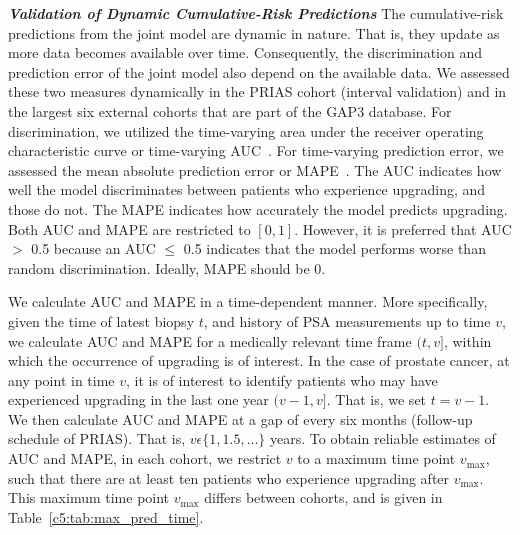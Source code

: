 \begin{subappendices}
\textbf{\textit{Validation of Dynamic Cumulative-Risk Predictions}}
The cumulative-risk predictions from the joint model are dynamic in nature. That is, they update as more data becomes available over time. Consequently, the discrimination and prediction error of the joint model also depend on the available data. We assessed these two measures dynamically in the PRIAS cohort (interval validation) and in the largest six external cohorts that are part of the GAP3 database. For discrimination, we utilized the time-varying area under the receiver operating characteristic curve or time-varying AUC~\citep{rizopoulos2017dynamic}. For time-varying prediction error, we assessed the mean absolute prediction error or MAPE~\citep{rizopoulos2017dynamic}. The AUC indicates how well the model discriminates between patients who experience upgrading, and those do not. The MAPE indicates how accurately the model predicts upgrading. Both AUC and MAPE are restricted to $[0,1]$. However, it is preferred that AUC $>$ 0.5 because an AUC $\leq$ 0.5 indicates that the model performs worse than random discrimination. Ideally, MAPE should be 0.

We calculate AUC and MAPE in a time-dependent manner. More specifically, given the time of latest biopsy $t$, and history of PSA measurements up to time $v$, we calculate AUC and MAPE for a medically relevant time frame $(t, v]$, within which the occurrence of upgrading is of interest. In the case of prostate cancer, at any point in time $v$, it is of interest to identify patients who may have experienced upgrading in the last one year $(v-1, v]$. That is, we set $t=v-1$. We then calculate AUC and MAPE at a gap of every six months (follow-up schedule of PRIAS). That is, $v \epsilon \{1, 1.5, \ldots \}$ years. To obtain reliable estimates of AUC and MAPE, in each cohort, we restrict $v$ to a maximum time point $v_{\mbox{max}}$, such that there are at least ten patients who experience upgrading after $v_{\mbox{max}}$. This maximum time point $v_{\mbox{max}}$ differs between cohorts, and is given in Table~\ref{c5:tab:max_pred_time}.


\end{subappendices}
